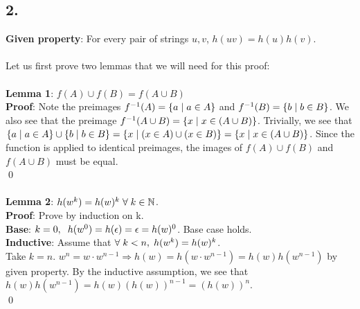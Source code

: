 \documentclass[11pt]{article}
\begin{document}
\subsection*{2.}
\textbf{Given property}: For every pair of strings $u,v$, $h(uv)=h(u)h(v)$. \\
\\
Let us first prove two lemmas that we will need for this proof: \\
\\
\textbf{Lemma 1}: $f(A)\cup f(B)=f(A\cup B)$ \\
\textbf{Proof}: Note the preimages $f^{-1}(A)=\{a\hspace{1mm}|\hspace{1mm}a\in A\}$ and $f^{-1}(B)=\{b\hspace{1mm}|\hspace{1mm}b\in B\}$. We also see that the preimage $f^{-1}(A\cup B)=\{x\hspace{1mm}|\hspace{1mm}x\in (A\cup B)\}$. Trivially, we see that $\{a\hspace{1mm}|\hspace{1mm}a\in A\}\cup\{b\hspace{1mm}|\hspace{1mm}b\in B\}=\{x\hspace{1mm}|\hspace{1mm}(x\in A)\cup(x\in B)\}=\{x\hspace{1mm}|\hspace{1mm}x\in(A\cup B)\}$. Since the function is applied to identical preimages, the images of $f(A)\cup f(B)$ and $f(A\cup B)$ must be equal. \\ \qed \\ 
\\
\textbf{Lemma 2}: $h(w^k)=h(w)^k \hspace{1mm}\forall\hspace{1mm}k\in\mathbb{N}$. \\
\textbf{Proof}: Prove by induction on k. \\
\textbf{Base}: $k=0,\hspace{2mm}h(w^0)=h(\epsilon)=\epsilon=h(w)^0$. Base case holds. \\
\textbf{Inductive}: Assume that $\forall\hspace{1mm}k<n,\hspace{1mm}h(w^k)=h(w)^k$. \\
Take $k=n$. $w^n=w\cdot w^{n-1}\Rightarrow h(w)=h(w\cdot w^{n-1})=h(w)h(w^{n-1})$ by given property. By the inductive assumption, we see that $h(w)h(w^{n-1})=h(w)(h(w))^{n-1}=(h(w))^n$. \\ \qed \\
\end{document}
